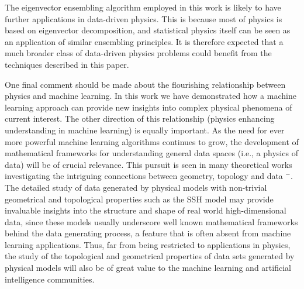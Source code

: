 \documentclass[fleqn,10pt]{wlscirep}
\begin{document}
The eigenvector ensembling algorithm employed in this work is likely to have further applications in data-driven physics. This is because most of physics is based on eigenvector decomposition, and statistical physics itself can be seen as an application of similar ensembling principles. It is therefore expected that a much broader class of data-driven physics problems could benefit from the techniques described in this paper.

One final comment should be made about the flourishing relationship between physics and machine learning. In this work we have demonstrated how a machine learning approach can provide new insights into complex physical phenomena of current interest. The other direction of this relationship (physics enhancing understanding in machine learning) is equally important. As the need for ever more powerful machine learning algorithms continues to grow, the development of mathematical frameworks for understanding general data spaces (i.e., a physics of data) will be of crucial relevance. This pursuit is seen in many theoretical works investigating the intriguing connections between geometry, topology and data \cite{carlsson2009topology}$^-$\cite{belkin2003problems}. The detailed study of data generated by physical models with non-trivial geometrical and topological properties such as the SSH model may provide invaluable insights into the structure and shape of real world high-dimensional data, since these models usually underscore well known mathematical frameworks behind the data generating process, a feature that is often absent from machine learning applications. Thus, far from being restricted to applications in physics, the study of the topological and geometrical properties of data sets generated by physical models will also be of great value to the machine learning and artificial intelligence communities.  
\end{document}
